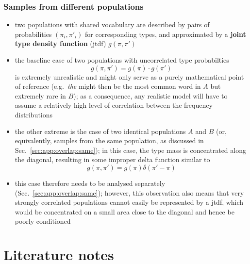 \documentclass[a4paper]{article}
\begin{document}

\subsubsection{Samples from different populations}
\label{sec:app:overlap:different}

\begin{itemize}
\item two populations with shared vocabulary are described by pairs of probabilities $(\pi_i, \pi'_i)$ for corresponding types, and approximated by a \textbf{joint type density function} (jtdf) $g(\pi, \pi')$
\item the baseline case of two populations with uncorrelated type probabilties
  \[
    g(\pi, \pi') = g(\pi)\cdot g(\pi')
  \]
  is extremely unrealistic and might only serve as a purely mathematical point of reference (e.g.\ \emph{the} might then be the most common word in $A$ but extremely rare in $B$); as a consequence, any realistic model will have to assume a relatively high level of correlation between the frequency distributions
\item the other extreme is the case of two identical populations $A$ and $B$ (or, equivalently, samples from the same population, as discussed in Sec.~\ref{sec:app:overlap:same}); in this case, the type mass is concentrated along the diagonal, resulting in some improper delta function similar to
  \[
    g(\pi, \pi') = g(\pi) \delta(\pi' - \pi)
  \]
\item this case therefore needs to be analysed separately (Sec.~\ref{sec:app:overlap:same}); however, this observation also means that very strongly correlated populations cannot easily be represented by a jtdf, which would be concentrated on a small area close to the diagonal and hence be poorly conditioned
\end{itemize}



\section{Literature notes}
\label{sec:literature}
\end{document}
